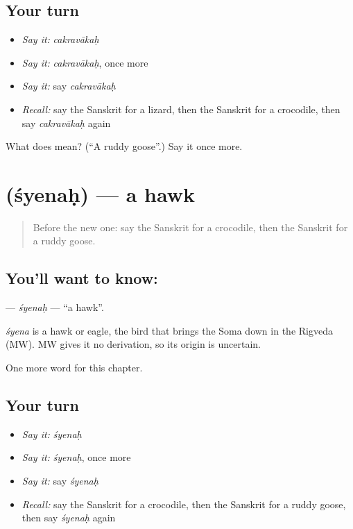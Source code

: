 \subsection*{Your turn}
\begin{itemize}
\raggedright
  \item \emph{Say it:} \emph{cakravākaḥ}
  \item \emph{Say it:} \emph{cakravākaḥ}, once more
  \item \emph{Say it:} say \emph{cakravākaḥ}
  \item \emph{Recall:} say the Sanskrit for a lizard, then the Sanskrit for a crocodile, then say \emph{cakravākaḥ} again
\end{itemize}

\begin{tcolorbox}[breakable,colback=teal!4,colframe=teal!35!black,title={Before you move on}]
What does  mean? (\textquotedblleft{}A ruddy goose\textquotedblright{}.) Say it once more.
\end{tcolorbox}
\section[\texorpdfstring{\sk{श्येनः} (śyenaḥ)}{श्येनः (śyenaḥ)}]{ (śyenaḥ) — a hawk}

\label{lesson:SA-C254-syenah}



\begin{quote}
Before the new one: say the Sanskrit for a crocodile, then the Sanskrit for a ruddy goose.
\end{quote}

\subsection*{You'll want to know: }
\textbf{} — \emph{śyenaḥ} — \textquotedblleft{}a hawk\textquotedblright{}.

\begin{cousinweb}
\emph{śyena} is a hawk or eagle, the bird that brings the Soma down in the Rigveda (MW). MW gives it no derivation, so its origin is uncertain.
\end{cousinweb}

\begin{grammarlens}[title={What you've built}]
One more word for this chapter.
\end{grammarlens}

\subsection*{Your turn}
\begin{itemize}
\raggedright
  \item \emph{Say it:} \emph{śyenaḥ}
  \item \emph{Say it:} \emph{śyenaḥ}, once more
  \item \emph{Say it:} say \emph{śyenaḥ}
  \item \emph{Recall:} say the Sanskrit for a crocodile, then the Sanskrit for a ruddy goose, then say \emph{śyenaḥ} again
\end{itemize}

